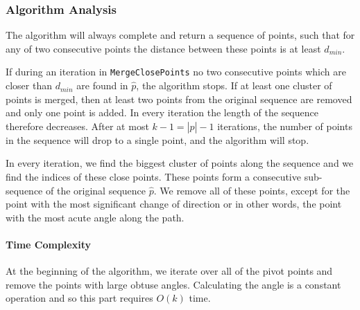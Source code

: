 \begin{algorithm}[]
	\BlankLine


	\BlankLine


\end{algorithm}

\subsubsection{Algorithm Analysis}

The algorithm will always complete and return a sequence of points, such that for any of two consecutive points the distance between these points is at least $d_{min}$. 

If during an iteration in \texttt{MergeClosePoints} no two consecutive points which are closer than $d_{min}$ are found in $\hat{p}$, the algorithm stops. If at least one cluster of points is merged, then at least two points from the original sequence are removed and only one point is added. In every iteration the length of the sequence therefore decreases. After at most $k-1=|\hat{p}|-1$ iterations, the number of points in the sequence will drop to a single point, and the algorithm will stop.

In every iteration, we find the biggest cluster of points along the sequence and we find the indices of these close points. These points form a consecutive sub-sequence of the original sequence $\hat{p}$. We remove all of these points, except for the point with the most significant change of direction or in other words, the point with the most acute angle along the path.

\paragraph{Time Complexity}

At the beginning of the algorithm, we iterate over all of the pivot points and remove the points with large obtuse angles. Calculating the angle is a constant operation and so this part requires $O(k)$ time.

